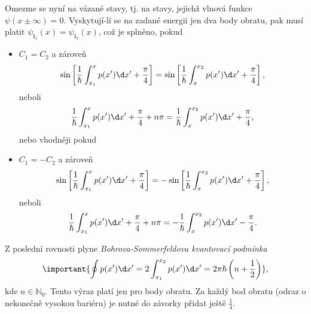 Omezme se nyní na vázané stavy, tj. na stavy, jejichž vlnová funkce $\psi(x\pm\infty)=0$.
Vyskytují-li se na zadané energii jen dva body obratu, pak musí platit $\psi_{\mathrm{I}_{1}}(x)=\psi_{\mathrm{I}_{2}}(x)$, což je splněno, pokud
\begin{itemize}
\item
    $C_{1}=C_{2}$ a zároveň
    \begin{equation}
        \sin\left[\frac{1}{\hbar}\int_{x_{1}}^{x}p(x')\d x'+\frac{\pi}{4}\right]=\sin\left[\frac{1}{\hbar}\int_{x}^{x_{2}}p(x')\d x'+\frac{\pi}{4}\right],
    \end{equation}
    neboli
    \begin{equation}
        \frac{1}{\hbar}\int_{x_{1}}^{x}p(x')\d x'+\frac{\pi}{4}+n\pi=\frac{1}{\hbar}\int_{x}^{x_{2}}p(x')\d x'+\frac{\pi}{4},
    \end{equation}
    nebo vhodněji pokud	
\item
    $C_{1}=-C_{2}$ a zároveň
    \begin{equation}
        \sin\left[\frac{1}{\hbar}\int_{x_{1}}^{x}p(x')\d x'+\frac{\pi}{4}\right]=-\sin\left[\frac{1}{\hbar}\int_{x}^{x_{2}}p(x')\d x'+\frac{\pi}{4}\right],
    \end{equation}
    neboli
    \begin{equation}
        \frac{1}{\hbar}\int_{x_{1}}^{x}p(x')\d x'+\frac{\pi}{4}+n\pi=-\frac{1}{\hbar}\int_{x}^{x_{2}}p(x')\d x'-\frac{\pi}{4}.
    \end{equation}
\end{itemize}
Z poslední rovnosti plyne \emph{Bohrova-Sommerfeldova kvantovací podmínka}
\begin{equation}
    \label{eq:BohrSommerfeld}
    \important{\oint p(x')\d x'=2\int_{x_{1}}^{x_{2}}p(x')\d x'=2\pi\hbar\left(n+\frac{1}{2}\right)},
\end{equation}
kde $n\in\mathbb{N}_{0}$.	
Tento výraz platí jen pro  body obratu.
Za každý  bod obratu (odraz o nekonečně vysokou bariéru) je nutné do závorky přidat ještě $\frac{1}{4}$.
